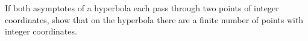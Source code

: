 If both asymptotes of a hyperbola each pass through two points of integer coordinates, show that on the hyperbola there are a finite number of points with integer coordinates.

